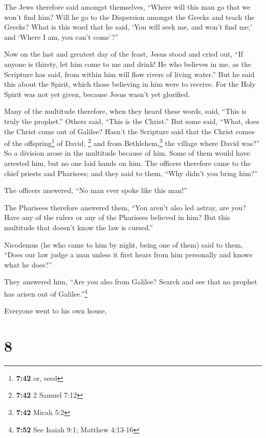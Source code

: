  The Jews therefore said amongst themselves, ``Where will
this man go that we won't find him? Will he go to the Dispersion amongst
the Greeks and teach the Greeks?  What is this word that
he said, `You will seek me, and won't find me;' and `Where I am, you
can't come'?''

 Now on the last and greatest day of the feast, Jesus
stood and cried out, ``If anyone is thirsty, let him come to me and
drink!  He who believes in me, as the Scripture has said,
from within him will flow rivers of living water.''  But
he said this about the Spirit, which those believing in him were to
receive. For the Holy Spirit was not yet given, because Jesus wasn't yet
glorified.

 Many of the multitude therefore, when they heard these
words, said, ``This is truly the prophet.''  Others said,
``This is the Christ.'' But some said, ``What, does the Christ come out
of Galilee?  Hasn't the Scripture said that the Christ
comes of the offspring\footnote{\textbf{7:42} or, seed} of David,
\footnote{\textbf{7:42} 2 Samuel 7:12} and from Bethlehem,\footnote{\textbf{7:42}
  Micah 5:2} the village where David was?''  So a
division arose in the multitude because of him.  Some of
them would have arrested him, but no one laid hands on him.
 The officers therefore came to the chief priests and
Pharisees; and they said to them, ``Why didn't you bring him?''

 The officers answered, ``No man ever spoke like this
man!''

 The Pharisees therefore answered them, ``You aren't also
led astray, are you?  Have any of the rulers or any of
the Pharisees believed in him?  But this multitude that
doesn't know the law is cursed.''

 Nicodemus (he who came to him by night, being one of
them) said to them,  ``Does our law judge a man unless it
first hears from him personally and knows what he does?''

 They answered him, ``Are you also from Galilee? Search
and see that no prophet has arisen out of Galilee.''\footnote{\textbf{7:52}
  See Isaiah 9:1; Matthew 4:13-16}

 Everyone went to his own house,

\hypertarget{section-7}{%
\section{8}\label{section-7}}


